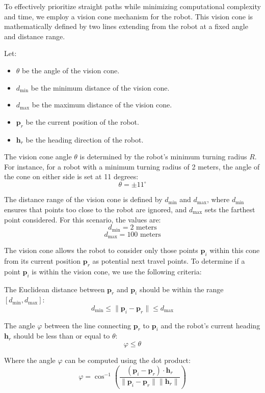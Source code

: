 To effectively prioritize straight paths while minimizing computational complexity and time, we employ a vision cone mechanism for the robot. This vision cone is mathematically defined by two lines extending from the robot at a fixed angle and distance range.

Let:

\begin{itemize}
    \item $\theta$ be the angle of the vision cone.
    \item $d_{\text{min}}$ be the minimum distance of the vision cone.
    \item $d_{\text{max}}$ be the maximum distance of the vision cone.
    \item $\mathbf{p}_r$ be the current position of the robot.
    \item $\mathbf{h}_r$ be the heading direction of the robot.
\end{itemize}

The vision cone angle $\theta$ is determined by the robot’s minimum turning radius $R$. For instance, for a robot with a minimum turning radius of 2 meters, the angle of the cone on either side is set at 11 degrees:
\[
\theta = \pm11^\circ
\]

The distance range of the vision cone is defined by $d_{\text{min}}$ and $d_{\text{max}}$, where $d_{\text{min}}$ ensures that points too close to the robot are ignored, and $d_{\text{max}}$ sets the farthest point considered. For this scenario, the values are:
\[
d_{\text{min}} = 2 \text{ meters}
\]
\[
d_{\text{max}} = 100 \text{ meters}
\]

The vision cone allows the robot to consider only those points $\mathbf{p}_i$ within this cone from its current position $\mathbf{p}_r$ as potential next travel points. To determine if a point $\mathbf{p}_i$ is within the vision cone, we use the following criteria:

The Euclidean distance between $\mathbf{p}_r$ and $\mathbf{p}_i$ should be within the range $[d_{\text{min}}, d_{\text{max}}]$:
\[
d_{\text{min}} \leq \| \mathbf{p}_i - \mathbf{p}_r \| \leq d_{\text{max}}
\]

The angle $\varphi$ between the line connecting $\mathbf{p}_r$ to $\mathbf{p}_i$ and the robot's current heading $\mathbf{h}_r$ should be less than or equal to $\theta$:
\[
\varphi \leq \theta
\]

Where the angle $\varphi$ can be computed using the dot product:
\[
\varphi = \cos^{-1} \left( \frac{(\mathbf{p}_i - \mathbf{p}_r) \cdot \mathbf{h}_r}{\| \mathbf{p}_i - \mathbf{p}_r \| \| \mathbf{h}_r \|} \right)
\]

